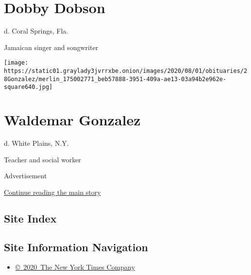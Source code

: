 \hypertarget{dobby-dobson}{%
\section{Dobby Dobson}\label{dobby-dobson}}

d. Coral Springs, Fla.

Jamaican singer and songwriter

\texttt{[image: https://static01.graylady3jvrrxbe.onion/images/2020/08/01/obituaries/28Gonzalez/merlin\_175002771\_beb57888-3951-409a-ae13-03a94b2e962e-square640.jpg]}

\hypertarget{waldemar-gonzalez}{%
\section{Waldemar Gonzalez}\label{waldemar-gonzalez}}

d. White Plains, N.Y.

Teacher and social worker

Advertisement

\protect\hyperlink{after-bottom}{Continue reading the main story}

\hypertarget{site-index}{%
\subsection{Site Index}\label{site-index}}

\hypertarget{site-information-navigation}{%
\subsection{Site Information
Navigation}\label{site-information-navigation}}

\begin{itemize}
\tightlist
\item
  \href{https://help.nytimes3xbfgragh.onion/hc/en-us/articles/115014792127-Copyright-notice}{©~2020~The
  New York Times Company}
\end{itemize}

